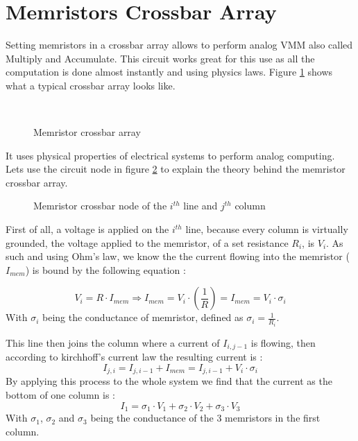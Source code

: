 \section{Memristors Crossbar Array}\label{sec:crossbar}

Setting memristors in a crossbar array allows to perform analog \ac{VMM} also called Multiply and Accumulate. This circuit works great for this use as all the computation is done almost instantly and using physics laws. Figure \ref{fig:crossbar} shows what a typical crossbar array looks like.

\begin{figure}[H]
  \centering
  \subfloat[Schematics]{}%
  \hfill
  \\
  \caption{Memristor crossbar array}
  \label{fig:crossbar}
\end{figure}

It uses physical properties of electrical systems to perform analog computing. Lets use the circuit node in figure \ref{fig:crossNode} to explain the theory behind the memristor crossbar array.
\begin{figure}[H]
  \centering
  
  \caption{Memristor crossbar node of the $i^{th}$ line and $j^{th}$ column}
  \label{fig:crossNode}
\end{figure}

First of all, a voltage is applied on the $i^{th}$ line, because every column is virtually grounded, the voltage applied to the memristor, of a set resistance $R_i$, is $V_i$. As such and using Ohm's law, we know the the current flowing into the memristor ($I_{mem}$) is bound by the following equation :

\begin{equation}
  V_i = R\cdot I_{mem} \Rightarrow I_{mem} = V_i\cdot (\frac{1}{R})=I_{mem} = V_i\cdot\sigma_i
\end{equation}
With $\sigma_i$ being the conductance of memristor, defined as $\sigma_i=\frac{1}{R_i}$.

This line then joins the column where a current of $I_{i,j-1}$ is flowing, then according to kirchhoff's current law the resulting current is :
\begin{equation}
  I_{j,i} = I_{j,i-1}+I_{mem} = I_{j,i-1} + V_i\cdot\sigma_i
\end{equation}
By applying this process to the whole system we find that the current as the bottom of one column is :
\begin{equation}
  I_1=\sigma_1\cdot V_1 + \sigma_2\cdot V_2 + \sigma_3\cdot V_3
\end{equation}
With $\sigma_1$, $\sigma_2$ and $\sigma_3$ being the conductance of the 3 memristors in the first column.


